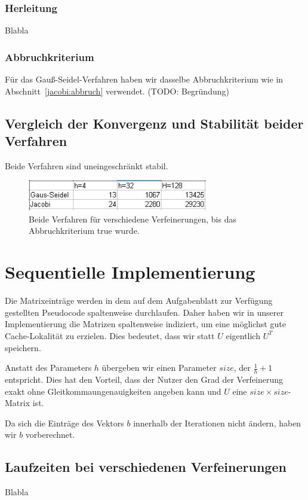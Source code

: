 \documentclass{article}
\begin{document}
\subsubsection{Herleitung}
Blabla
\subsubsection{Abbruchkriterium}
Für das Gauß-Seidel-Verfahren haben wir dasselbe Abbruchkriterium wie in Abschnitt~\ref{jacobi:abbruch} verwendet. (TODO: Begründung)

\subsection{Vergleich der Konvergenz und Stabilität beider Verfahren}\label{konvergenz}
Beide Verfahren sind uneingeschränkt stabil.
\begin{figure}[htbp] 
  \centering
     \includegraphics[width=0.7\textwidth]{bilder/convergenz.png}
  \caption{Beide Verfahren für verschiedene Verfeinerungen, bis das Abbruchkriterium true wurde.}
  \label{fig:Bild1}
\end{figure}

\section{Sequentielle Implementierung}

Die Matrixeinträge werden in dem auf dem Aufgabenblatt zur Verfügung gestellten Pseudocode spaltenweise durchlaufen. Daher haben wir in unserer Implementierung die Matrizen spaltenweise indiziert, um eine möglichst gute Cache-Lokalität zu erzielen. Dies bedeutet, dass wir statt $U$ eigentlich $U^T$ speichern.

Anstatt des Parameters $h$ übergeben wir einen Parameter $size$, der $\frac{1}{h}+1$ entspricht. Dies hat den Vorteil, dass der Nutzer den Grad der Verfeinerung exakt ohne Gleitkommaungenauigkeiten angeben kann und $U$ eine $size \times size$-Matrix ist.
 
Da sich die Einträge des Vektors $b$ innerhalb der Iterationen nicht ändern, haben wir $b$ vorberechnet.

\subsection{Laufzeiten bei verschiedenen Verfeinerungen}
Blabla
\end{document}
